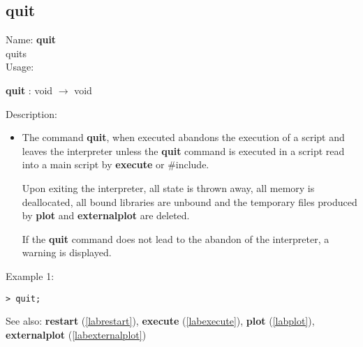 \subsection{quit}
\label{labquit}
\noindent Name: \textbf{quit}\\
quits \sollya\\

\noindent Usage: 
\begin{center}
\textbf{quit} : \textsf{void} $\rightarrow$ \textsf{void}\\
\end{center}
\noindent Description: \begin{itemize}

\item The command \textbf{quit}, when executed abandons the execution of a \sollya
   script and leaves the \sollya interpreter unless the \textbf{quit} command 
   is executed in a \sollya script read into a main \sollya script by
   \textbf{execute} or $\#$include.
    
   Upon exiting the \sollya interpreter, all state is thrown away, all
   memory is deallocated, all bound libraries are unbound and the
   temporary files produced by \textbf{plot} and \textbf{externalplot} are deleted.
    
   If the \textbf{quit} command does not lead to the abandon of the \sollya
   interpreter, a warning is displayed.
\end{itemize}
\noindent Example 1: 
\begin{center}\begin{minipage}{15cm}\begin{Verbatim}[frame=single]
> quit;
\end{Verbatim}
\end{minipage}\end{center}
See also: \textbf{restart} (\ref{labrestart}), \textbf{execute} (\ref{labexecute}), \textbf{plot} (\ref{labplot}), \textbf{externalplot} (\ref{labexternalplot})

